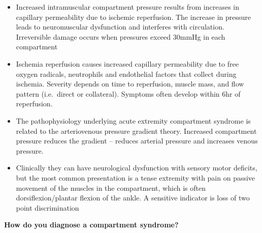 \documentclass[
]{book}
\begin{document}
\begin{itemize}
\item
  Increased intramuscular compartment pressure results from increases
  in capillary permeability due to ischemic reperfusion. The increase
  in pressure leads to neuromuscular dysfunction and interferes with
  circulation. Irreversible damage occurs when pressures exceed 30mmHg
  in each compartment~~
\item
  Ischemia reperfusion causes increased capillary permeability due to
  free oxygen radicals, neutrophils and endothelial factors that
  collect during ischemia. Severity depends on time to reperfusion,
  muscle mass, and flow pattern (i.e.~direct or collateral). Symptoms
  often develop within 6hr of reperfusion. \citep{vonkeudell2015}
\item
  The pathophysiology underlying acute extremity compartment syndrome
  is related to the arteriovenous pressure gradient theory. Increased
  compartment pressure reduces the gradient -- reduces arterial
  pressure and increases venous pressure.\citep{frink2010, mcqueen1996, elliott2003, papalambros1989}
\item
  Clinically they can have neurological dysfunction with sensory motor
  deficits, but the most common presentation is a tense extremity with
  pain on passive movement of the muscles in the compartment, which is
  often dorsiflexion/plantar flexion of the ankle. A sensitive
  indicator is loss of two point discrimination
\end{itemize}

\textbf{How do you diagnose a compartment syndrome?}
\end{document}
